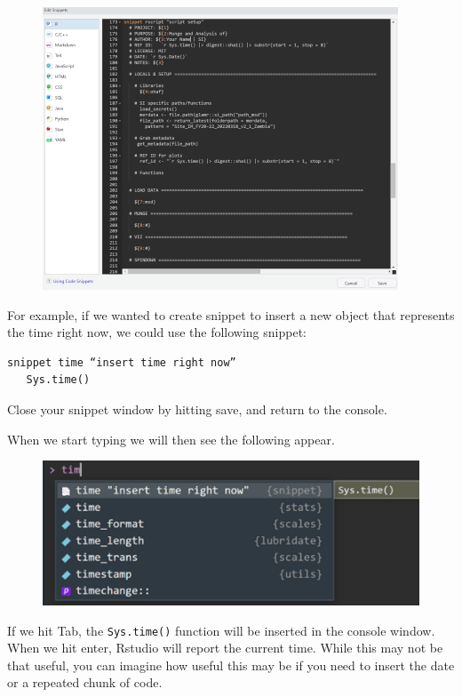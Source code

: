\documentclass[
  letterpaper,
  DIV=11,
  numbers=noendperiod]{scrreprt}
\begin{document}
\begin{figure}

{\centering \includegraphics{./images/r_setup-snippet-window.png}

}

\end{figure}

For example, if we wanted to create snippet to insert a new object that
represents the time right now, we could use the following snippet:

\begin{verbatim}
snippet time “insert time right now”     
   Sys.time()
\end{verbatim}

Close your snippet window by hitting save, and return to the console.

When we start typing we will then see the following appear.

\begin{figure}

{\centering \includegraphics{./images/r_setup-snippet_insert.png}

}

\end{figure}

If we hit Tab, the \texttt{Sys.time()} function will be inserted in the
console window. When we hit enter, Rstudio will report the current time.
While this may not be that useful, you can imagine how useful this may
be if you need to insert the date or a repeated chunk of code.
\end{document}
